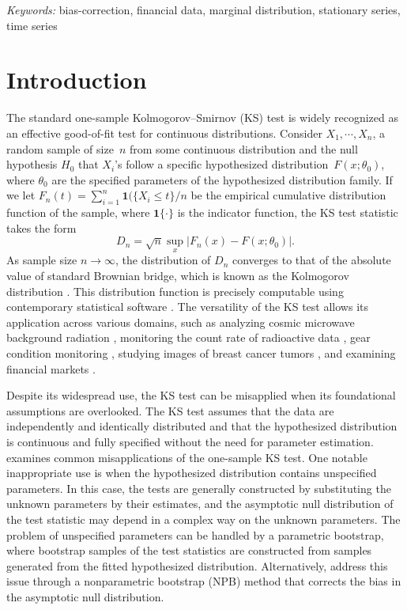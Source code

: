 \documentclass[12pt]{article}
\begin{document}
\noindent%
{\it Keywords:}  bias-correction, financial data, marginal distribution,
  stationary series, time series
\vfill

\newpage

\doublespacing

\section{Introduction}\label{sec:intro}

The standard one-sample Kolmogorov--Smirnov (KS) test is widely
recognized as an effective good-of-fit test for continuous distributions.
Consider $X_1,  \cdots , X_n$, a random sample of size~$n$ from some continuous
distribution and the null hypothesis $H_0$ that $X_i$'s follow a specific
hypothesized distribution~$F(x; \theta_0)$, where $\theta_0$ are the
specified parameters
of the hypothesized distribution family.
If we let $F_n(t) = \sum_{i=1}^n \mathbf{1}(\{X_i \le t\} / n$ be the empirical cumulative
distribution function of the sample, where $\mathbf{1}\{\cdot\}$ is the indicator
function, the KS test statistic takes the form
\[
  D_n = \sqrt{n} \sup_x | F_{n}(x) - F(x; \theta_0)|.
\]
As sample size $n\to \infty$, the distribution of $D_n$ converges to that of the
absolute value of standard Brownian bridge, which is known as the Kolmogorov
distribution \citep{stephens1974edf}. This distribution function is
precisely computable using contemporary statistical software
\citep{marsaglia2003evaluating}. The versatility of the KS test allows its
application across various domains, such as analyzing cosmic microwave
background radiation \citep{naess2012application}, monitoring the count rate of
radioactive data \citep{aslam2020introducing}, gear condition monitoring
\citep{andrade2001gear}, studying images of breast cancer tumors
\citep{demidenko2004kolmogorov}, and examining financial markets
\citep{lux2001turbulence}.


Despite its widespread use, the KS test can be
misapplied when its foundational assumptions are overlooked. The KS test
assumes that the data are independently and identically distributed and
that the hypothesized distribution is continuous and fully specified without
the need for parameter estimation. \citet{zeimbekakis2024misuses} examines
common misapplications of the one-sample KS test. One notable inappropriate
use is when the hypothesized distribution contains unspecified parameters.
In this case, the tests are generally constructed by substituting the unknown
parameters by their estimates, and the asymptotic null distribution of
the test statistic may depend in a complex way on the unknown parameters.
The problem of unspecified parameters can be handled by a parametric
bootstrap, where bootstrap samples of the test statistics are constructed from
samples generated from the fitted hypothesized distribution.
Alternatively, \citet{babu2004goodness} address this issue through a
nonparametric bootstrap (NPB) method that corrects the bias in the asymptotic null
distribution.
\end{document}
